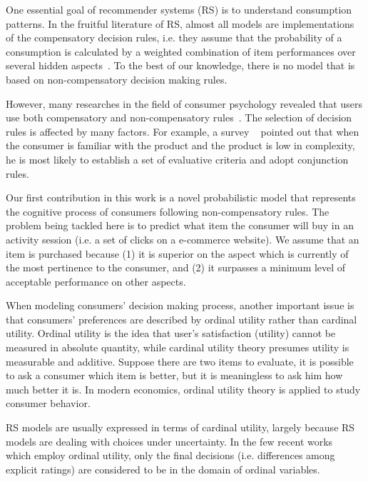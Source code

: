 \documentclass[sigconf]{acmart}
\begin{document}
One essential goal of recommender systems (RS) is to understand consumption patterns. In the fruitful literature of RS, almost all models are implementations of the compensatory decision rules, i.e. they assume that the probability of a consumption is calculated by a weighted combination of item performances over several hidden aspects~\cite{Hu2008Collaborative,Gopalan2015Scalable}.  To the best of our knowledge, there is no model that is based on non-compensatory decision making rules. 

However, many researches in the field of consumer psychology revealed that users use both compensatory and non-compensatory rules~\cite{Engel1986Consumer}. The selection of decision rules is affected by many factors.  For example,  a survey ~\cite{Park1976Effect} pointed out that when the consumer is familiar with the product and the product is low in  complexity, he is most likely to establish a set of evaluative criteria and adopt conjunction rules.    


Our first contribution in this work is a novel probabilistic model that represents the cognitive process of consumers following non-compensatory rules. The problem being tackled here is to predict what item the consumer will buy in an activity session (i.e. a set of clicks on a e-commerce website). We assume that an item is purchased because (1) it is superior on the aspect which is currently of the most pertinence to the consumer, and (2) it surpasses  a minimum level of acceptable performance on other aspects. 

When modeling consumers' decision making process, another important issue is that consumers' preferences are described by ordinal utility rather than cardinal utility.  Ordinal utility is the idea that user's satisfaction (utility) cannot be measured in absolute quantity, while cardinal utility theory presumes utility is measurable and additive.  Suppose there are two items to evaluate, it is possible to ask a consumer which item is better, but it is meaningless to ask him how much better it is. In modern economics, ordinal utility theory is applied to study consumer behavior.

RS models are usually expressed in terms of cardinal utility, largely because RS models are dealing with choices under uncertainty.  In the few recent works~\cite{Frolov2016Fifty} which employ ordinal utility, only the final decisions (i.e. differences among explicit ratings) are considered to be in the domain of ordinal variables. 
\end{document}
